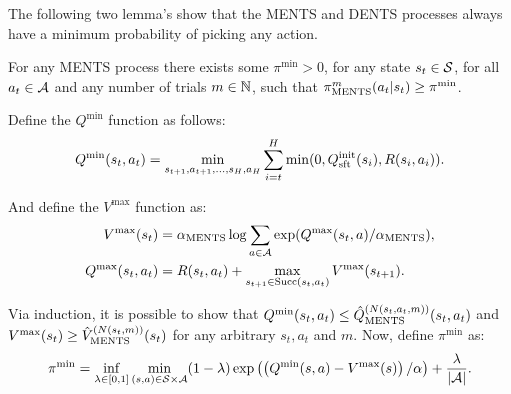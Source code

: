             
            The following two lemma's show that the MENTS and DENTS processes always have a minimum probability of picking any action. 
            \begin{lemma} \label{lem:min_prob_ments}
                For any MENTS process there exists some $\pi^{\min}>0$, for any state $s_t\in\mathcal{S}$, for all $a_t\in\mathcal{A}$ and any number of trials $m\in\mathbb{N}$, such that ${\pi^{m}_{{\textnormal{MENTS}}}}(a_t|s_t)\geq\pi^{\min}$.
            \end{lemma}
            \begin{proofoutline}
                Define the $Q^{\min}$ function as follows:
                \begin{align}
                    Q^{\min}(s_t,a_t) = \min_{s_{t+1},a_{t+1},...,s_H,a_H} \sum_{i=t}^H \min(0, Q^{\text{init}}_{{\textnormal{sft}}}(s_i), R(s_i,a_i)).
                \end{align}
                
                And define the $V^{\max}$ function as:
                \begin{align}
                    V^{\max}(s_t) &= {\alpha_{{\textnormal{MENTS}}}} \log \sum_{a\in\mathcal{A}} \exp (Q^{\max}(s_t,a)/{\alpha_{{\textnormal{MENTS}}}}), \label{appeq:vmax} \\
                    Q^{\max}(s_t,a_t) &= R(s_t,a_t)+\max_{s_{t+1}\in{\textnormal{Succ}(s_t,a_t)}} V^{\max}(s_{t+1}).
                \end{align}
                
                Via induction, it is possible to show that $Q^{\min}(s_t,a_t)\leq {\hat{Q}^{(N(s_t,a_t,m))}_{{\textnormal{MENTS}}}}(s_t,a_t)$ and $V^{\max}(s_t)\geq {\hat{V}^{(N(s_t,m))}_{{\textnormal{MENTS}}}}(s_t)$ for any arbitrary $s_t,a_t$ and $m$. Now, define $\pi^{\min}$ as:
                \begin{align}
                    \pi^{\min} = \inf_{\lambda\in[0,1]} \min_{(s,a)\in\mathcal{S}\times\mathcal{A}} (1-\lambda) \exp\left(\left(Q^{\min}(s,a)-V^{\max}(s)\right)/\alpha\right) + \frac{\lambda}{|\mathcal{A}|}. \label{eq:pi_min}
                \end{align}
                

\end{proofoutline}
